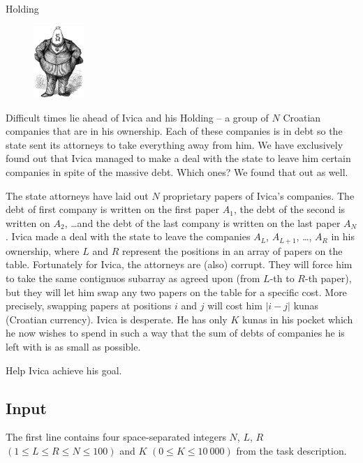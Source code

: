 \begin{statement}[
  problempoints=110,
  timelimit=1 second,
  memorylimit=512 MiB,
]{Holding}

\setlength\intextsep{-0.1cm}
\begin{figure}
\centering
\includegraphics[width=0.17\textwidth]{img/holding.png}
\end{figure}

Difficult times lie ahead of Ivica and his Holding -- a group of $N$ Croatian
companies that are in his ownership. Each of these companies is in debt so the
state sent its attorneys to take everything away from him. We have exclusively
found out that Ivica managed to make a deal with the state to leave him certain
companies in spite of the massive debt. Which ones? We found that out as well.

The state attorneys have laid out $N$ proprietary papers of Ivica's companies.
The debt of first company is written on the first paper $A_1$, the debt of the
second is written on $A_2$, \dots and the debt of the last company is written
on the last paper $A_N$. Ivica made a deal with the state to leave the companies
$A_L$, $A_{L+1}$, \dots , $A_R$ in his ownership, where $L$ and $R$ represent
the positions in an array of papers on the table. Fortunately for Ivica, the
attorneys are (also) corrupt. They will force him to take the same contignuos
subarray as agreed upon (from $L$-th to $R$-th paper), but they will let him
swap any two papers on the table for a specific cost. More precisely, swapping
papers at positions $i$ and $j$ will cost him $|i-j|$ kunas (Croatian currency).
Ivica is desperate. He has only $K$ kunas in his pocket which he now wishes to
spend in such a way that the sum of debts of companies he is left with is as
small as possible.

Help Ivica achieve his goal.

\subsection*{Input}
The first line contains four space-separated integers $N$, $L$, $R$
$(1 \le L \le R \le N \le 100)$ and $K$ $(0 \le K \le 10\ 000)$ from the
task description.


\end{statement}

